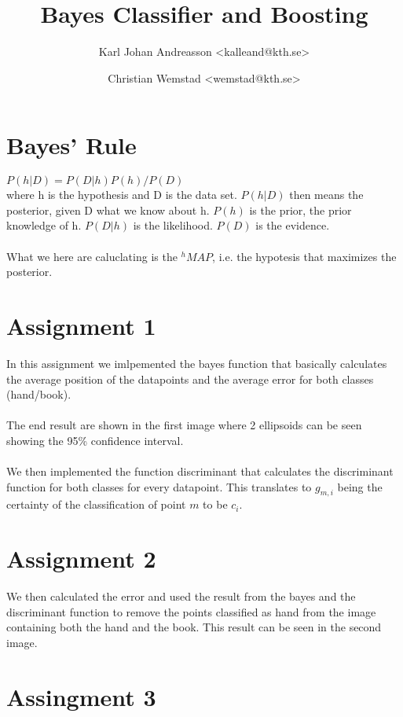 \documentclass[a4paper]{article}
\title{Bayes Classifier and Boosting}
\author{Karl Johan Andreasson <{kalleand@kth.se}> %
\and Christian Wemstad <{wemstad@kth.se}> %
}
\begin{document}
\thispagestyle{empty}
\maketitle
\thispagestyle{empty}
\pagestyle{empty}
\newpage
\pagestyle{fancy}
\setcounter{page}{1}
\section{Bayes' Rule}
$P(h|D) = P(D|h)P(h)/P(D)$
\\ where h is the hypothesis and D is the data set.
$P(h|D)$ then means the posterior, given D what we know about h.
$P(h)$ is the prior, the prior knowledge of h.
$P(D|h)$ is the likelihood.
$P(D)$ is the evidence.
\\
\\
\noindent What we here are caluclating is the $^hMAP$,
i.e. the hypotesis that maximizes the posterior.

\section{Assignment 1}
In this assignment we imlpemented the bayes function that basically calculates
the average position of the datapoints and the average error for both classes
(hand/book).
\\
\\
\noindent The end result are shown in the first image where 2 ellipsoids
can be seen showing the 95\% confidence interval.
\\
\\
\noindent We then implemented the function discriminant that calculates the
discriminant function for both classes for every datapoint. This translates to
$g_{m,i}$ being the certainty of the classification of point $m$ to be $c_i$.

\section{Assignment 2}

We then calculated the error and used the result from the bayes and the
discriminant function to remove the points classified as hand from the image
containing both the hand and the book. This result can be seen in the second
image.
\section{Assingment 3}
\end{document}
